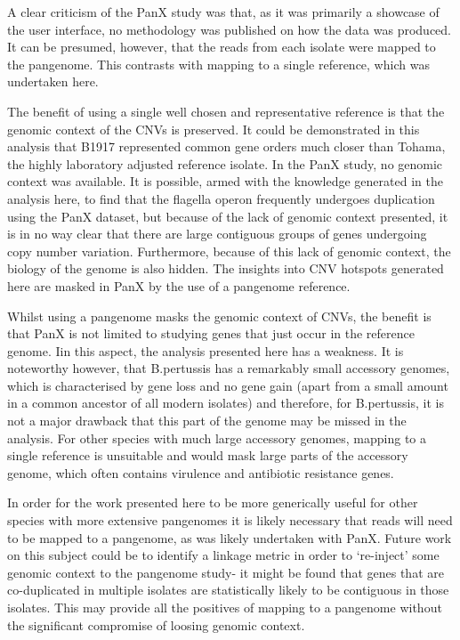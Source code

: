 \documentclass{article}
\begin{document}
A clear criticism of the PanX study was that, as it was primarily a showcase of the user interface, no methodology was published on how the data was produced. It can be presumed, however, that the reads from each isolate were mapped to the pangenome. This contrasts with mapping to a single reference, which was undertaken here. 

The benefit of using a single well chosen and representative reference is that the genomic context of the CNVs is preserved. It could be demonstrated in this analysis that B1917 represented common gene orders much closer than Tohama, the highly laboratory adjusted reference isolate. In the PanX study, no genomic context was available. It is possible, armed with the knowledge generated in the analysis here, to find that the flagella operon frequently undergoes duplication using the PanX dataset, but because of the lack of genomic context presented, it is in no way clear that there are large contiguous groups of genes undergoing copy number variation. Furthermore, because of this lack of genomic context, the biology of the genome is also hidden. The insights into CNV hotspots generated here are masked in PanX by the use of a pangenome reference.

Whilst using a pangenome masks the genomic context of CNVs, the benefit is that PanX is not limited to studying genes that just occur in the reference genome. Iin this aspect, the analysis presented here has a weakness. It is noteworthy however, that B.pertussis has a remarkably small accessory genomes, which is characterised by gene loss and no gene gain (apart from a small amount in a common ancestor of all modern isolates) and therefore, for B.pertussis, it is not a major drawback that this part of the genome may be missed in the analysis. For other species with much large accessory genomes, mapping to a single reference is unsuitable and would mask large parts of the accessory genome, which often contains virulence and antibiotic resistance genes.

In order for the work presented here to be more generically useful for other species with more extensive pangenomes it is likely necessary that reads will need to be mapped to a pangenome, as was likely undertaken with PanX. Future work on this subject could be to identify a linkage metric in order to `re-inject' some genomic context to the pangenome study- it might be found that genes that are co-duplicated in multiple isolates are statistically likely to be contiguous in those isolates. This may provide all the positives of mapping to a pangenome without the significant compromise of loosing genomic context.
\end{document}
